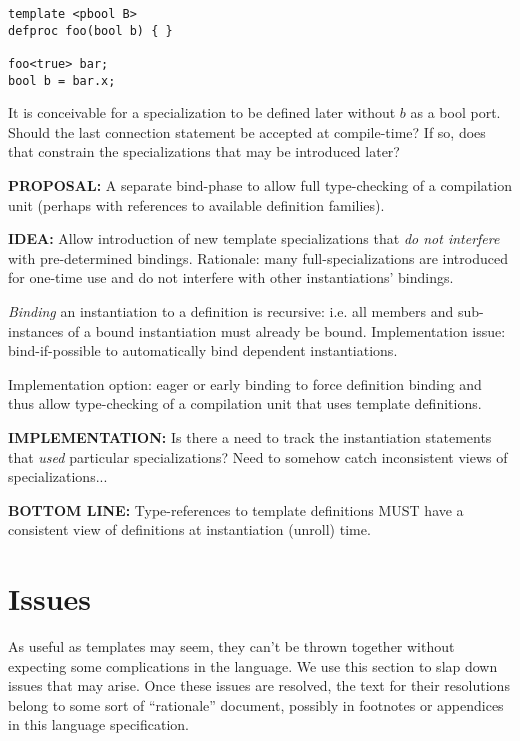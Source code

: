 \begin{verbatim}
template <pbool B>
defproc foo(bool b) { }

foo<true> bar;
bool b = bar.x;
\end{verbatim}

It is conceivable for a specialization to be defined later without
$b$ as a bool port.  
Should the last connection statement be accepted at compile-time?
If so, does that constrain the specializations that may be introduced later?


\textbf{PROPOSAL:}
A separate bind-phase to allow full type-checking of a compilation unit
(perhaps with references to available definition families).  

\textbf{IDEA:}
Allow introduction of new template specializations that
\emph{do not interfere} with pre-determined bindings.  
Rationale: many full-specializations are introduced for one-time use and
do not interfere with other instantiations' bindings.  

\emph{Binding} an instantiation to a definition is recursive: i.e.
all members and sub-instances of a bound instantiation must already be bound.  
Implementation issue: bind-if-possible to automatically bind dependent
instantiations.  

Implementation option: eager or early binding to force 
definition binding and thus allow type-checking of a 
compilation unit that uses template definitions.  

\textbf{IMPLEMENTATION:}
Is there a need to track the instantiation statements that \emph{used}
particular specializations?  Need to somehow catch inconsistent views
of specializations...

\textbf{BOTTOM LINE:}
Type-references to template definitions MUST have a consistent
view of definitions at instantiation (unroll) time.  

\section{Issues}
\label{sec:templates:issues}

As useful as templates may seem, they can't be thrown together without
expecting some complications in the language.  
We use this section to slap down issues that may arise.  
Once these issues are resolved, the text for their resolutions
belong to some sort of ``rationale'' document, possibly
in footnotes or appendices in this language specification.  

